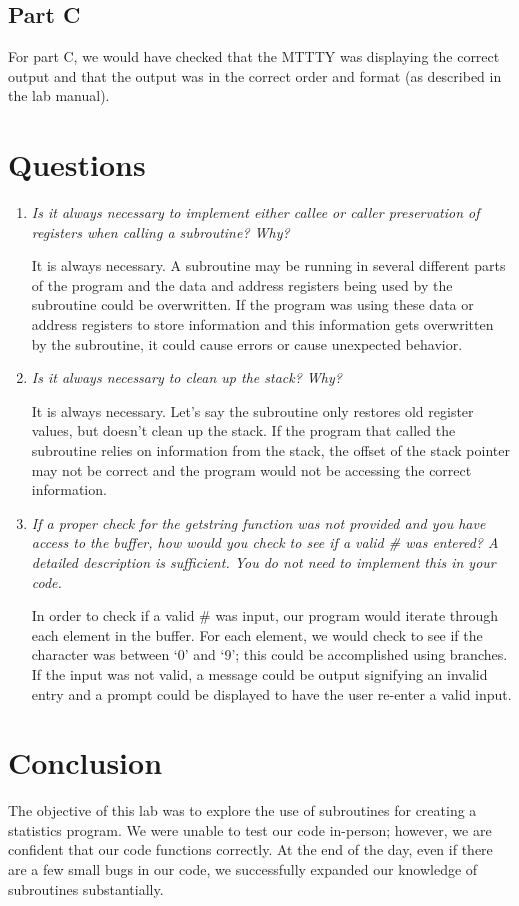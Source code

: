 \documentclass[10pt, letterpaper, titlepage]{article} %
\begin{document}
\begin{multicols*}{2}
\subsection{Part C}
For part C, we would have checked that the MTTTY was displaying the correct output and that the output was in the correct order and format (as described in the lab manual). 

\section{Questions}
\begin{enumerate}
\item \textit{Is it always necessary to implement either callee or caller preservation of registers when calling a subroutine? Why?}

It is always necessary. 
A subroutine may be running in several different parts of the program and the data and address registers being used by the subroutine could be overwritten. 
If the program was using these data or address registers to store information and this information gets overwritten by the subroutine, it could cause errors or cause unexpected behavior.

\item \textit{Is it always necessary to clean up the stack? Why?}

It is always necessary. 
Let's say the subroutine only restores old register values, but doesn't clean up the stack. 
If the program that called the subroutine relies on information from the stack, the offset of the stack pointer may not be correct and the program would not be accessing the correct information. 

\item \textit{If a proper check for the getstring function was not provided and you have access to the buffer, how would you check to see if a valid \# was entered? A detailed description is sufficient. You do not need to implement this in your code.}

In order to check if a valid \# was input, our program would iterate through each element in the buffer. 
For each element, we would check to see if the character was between `0' and `9'; this could be accomplished using branches. 
If the input was not valid, a message could be output signifying an invalid entry and a prompt could be displayed to have the user re-enter a valid input. 
\end{enumerate}

\section{Conclusion}
The objective of this lab was to explore the use of subroutines for creating a statistics program. 
We were unable to test our code in-person; however, we are confident that our code functions correctly. 
At the end of the day, even if there are a few small bugs in our code, we successfully expanded our knowledge of subroutines substantially.


\end{multicols*}
\end{document}
